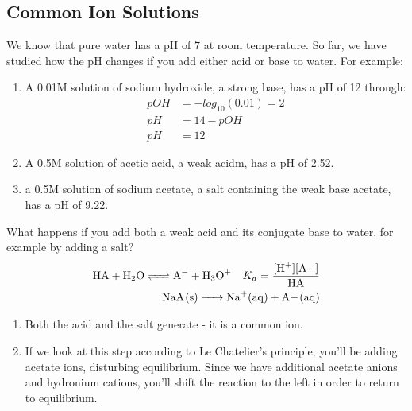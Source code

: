\documentclass{article}  %
\begin{document}
\subsection*{Common Ion Solutions}
We know that pure water has a pH of 7 at room temperature. 
So far, we have studied how the pH changes if you add either acid or base to water. For example:
\begin{enumerate}
    \item A 0.01M solution of sodium hydroxide, a strong base, has a pH of 12 through:
    \begin{equation*}
        \begin{aligned}
            pOH &= -log_{10}(0.01) = 2 \\
            pH &= 14-pOH \\
            pH &= 12
        \end{aligned}
    \end{equation*}
    \item A 0.5M solution of acetic acid, a weak acidm, has a pH of 2.52.
    \item a 0.5M solution of sodium acetate, a salt containing the weak base acetate, has a pH of 9.22.
\end{enumerate}
What happens if you add both a weak acid and its conjugate base to water, for example by adding a salt?
\begin{equation*}
    \begin{aligned}
        \ce{HA + H2O <=> A- + H3O+} \quad K_a = \ce{\frac{[H+][A-]}{HA}} \\
        \ce{NaA_(s) -> Na+_(aq) + A-_(aq)} 
    \end{aligned}
\end{equation*}
\begin{enumerate}
    \item Both the acid and the salt generate  - it is a common ion.
    \item If we look at this step according to Le Chatelier's principle, you'll be adding acetate ions, disturbing equilibrium. Since we have additional acetate anions and hydronium cations, you'll shift the reaction to the left in order to return to equilibrium.
\end{enumerate}
\end{document}
